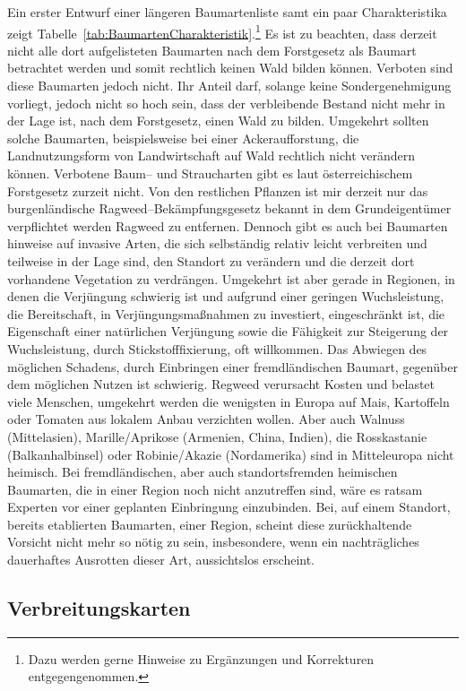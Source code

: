 \documentclass[twocolumn]{scrartcl}
\begin{document}
Ein erster Entwurf einer längeren Baumartenliste samt ein paar Charakteristika
zeigt Tabelle~\ref{tab:BaumartenCharakteristik}.\footnote{Dazu werden gerne
Hinweise zu Ergänzungen und Korrekturen entgegengenommen.} Es ist zu beachten,
dass derzeit nicht alle dort aufgelisteten Baumarten nach dem Forstgesetz als
Baumart betrachtet werden und somit rechtlich keinen Wald bilden können.
Verboten sind diese Baumarten jedoch nicht. Ihr Anteil darf, solange keine
Sondergenehmigung vorliegt, jedoch nicht so hoch sein, dass der verbleibende
Bestand nicht mehr in der Lage ist, nach dem Forstgesetz, einen Wald zu bilden.
Umgekehrt sollten solche Baumarten, beispielsweise bei einer Ackeraufforstung,
die Landnutzungsform von Landwirtschaft auf Wald rechtlich nicht verändern
können. Verbotene Baum-- und Straucharten gibt es laut österreichischem
Forstgesetz zurzeit nicht. Von den restlichen Pflanzen ist mir derzeit nur das
burgenländische Ragweed--Bekämpfungsgesetz bekannt in dem Grundeigentümer
verpflichtet werden Ragweed zu entfernen. Dennoch gibt es auch bei Baumarten
hinweise auf invasive Arten, die sich selbständig relativ leicht verbreiten und
teilweise in der Lage sind, den Standort zu verändern und die derzeit dort
vorhandene Vegetation zu verdrängen. Umgekehrt ist aber gerade in Regionen, in
denen die Verjüngung schwierig ist und aufgrund einer geringen Wuchsleistung,
die Bereitschaft, in Verjüngungsmaßnahmen zu investiert, eingeschränkt ist, die
Eigenschaft einer natürlichen Verjüngung sowie die Fähigkeit zur Steigerung der
Wuchsleistung, durch Stickstofffixierung, oft willkommen. Das Abwiegen des
möglichen Schadens, durch Einbringen einer fremdländischen Baumart, gegenüber
dem möglichen Nutzen ist schwierig. Regweed verursacht Kosten und belastet viele
Menschen, umgekehrt werden die wenigsten in Europa auf Mais, Kartoffeln oder
Tomaten aus lokalem Anbau verzichten wollen. Aber auch Walnuss (Mittelasien),
Marille/Aprikose (Armenien, China, Indien), die Rosskastanie (Balkanhalbinsel)
oder Robinie/Akazie (Nordamerika) sind in Mitteleuropa nicht heimisch. Bei
fremdländischen, aber auch standortsfremden heimischen Baumarten, die in einer
Region noch nicht anzutreffen sind, wäre es ratsam Experten vor einer geplanten
Einbringung einzubinden. Bei, auf einem Standort, bereits etablierten Baumarten,
einer Region, scheint diese zurückhaltende Vorsicht nicht mehr so nötig zu sein,
insbesondere, wenn ein nachträgliches dauerhaftes Ausrotten dieser Art,
aussichtslos erscheint.

\subsection{Verbreitungskarten}
\label{sec:verbreitungskarten}
\end{document}
